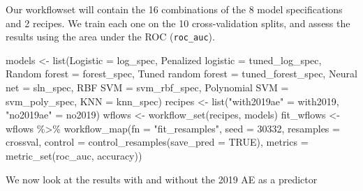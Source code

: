 \documentclass[
]{article}
\newenvironment{Shaded}{\begin{snugshade}}{\end{snugshade}}
\newcommand{\AttributeTok}[1]{\textcolor[rgb]{0.77,0.63,0.00}{#1}}
\newcommand{\ConstantTok}[1]{\textcolor[rgb]{0.00,0.00,0.00}{#1}}
\newcommand{\DecValTok}[1]{\textcolor[rgb]{0.00,0.00,0.81}{#1}}
\newcommand{\FunctionTok}[1]{\textcolor[rgb]{0.00,0.00,0.00}{#1}}
\newcommand{\NormalTok}[1]{#1}
\newcommand{\OtherTok}[1]{\textcolor[rgb]{0.56,0.35,0.01}{#1}}
\newcommand{\SpecialCharTok}[1]{\textcolor[rgb]{0.00,0.00,0.00}{#1}}
\newcommand{\StringTok}[1]{\textcolor[rgb]{0.31,0.60,0.02}{#1}}
\begin{document}
Our workflowset will contain the 16 combinations of the 8 model
specifications and 2 recipes. We train each one on the 10
cross-validation splits, and assess the results using the area under the
ROC (\texttt{roc\_auc}).

\begin{Shaded}
\begin{Highlighting}[]
\NormalTok{models }\OtherTok{\textless{}{-}} \FunctionTok{list}\NormalTok{(}\AttributeTok{Logistic =}\NormalTok{ log\_spec,}
               \StringTok{\textasciigrave{}}\AttributeTok{Penalized logistic}\StringTok{\textasciigrave{}} \OtherTok{=}\NormalTok{ tuned\_log\_spec,}
               \StringTok{\textasciigrave{}}\AttributeTok{Random forest}\StringTok{\textasciigrave{}} \OtherTok{=}\NormalTok{ forest\_spec,}
               \StringTok{\textasciigrave{}}\AttributeTok{Tuned random forest}\StringTok{\textasciigrave{}} \OtherTok{=}\NormalTok{ tuned\_forest\_spec,}
               \StringTok{\textasciigrave{}}\AttributeTok{Neural net}\StringTok{\textasciigrave{}} \OtherTok{=}\NormalTok{ sln\_spec,}
               \StringTok{\textasciigrave{}}\AttributeTok{RBF SVM}\StringTok{\textasciigrave{}} \OtherTok{=}\NormalTok{ svm\_rbf\_spec,}
               \StringTok{\textasciigrave{}}\AttributeTok{Polynomial SVM}\StringTok{\textasciigrave{}} \OtherTok{=}\NormalTok{ svm\_poly\_spec,}
               \StringTok{\textasciigrave{}}\AttributeTok{KNN}\StringTok{\textasciigrave{}} \OtherTok{=}\NormalTok{ knn\_spec)}
\NormalTok{recipes }\OtherTok{\textless{}{-}} \FunctionTok{list}\NormalTok{(}\StringTok{"with2019ae"} \OtherTok{=}\NormalTok{ with2019,}
                \StringTok{"no2019ae"} \OtherTok{=}\NormalTok{ no2019)}
\NormalTok{wflows }\OtherTok{\textless{}{-}} \FunctionTok{workflow\_set}\NormalTok{(recipes, models)}
\NormalTok{fit\_wflows }\OtherTok{\textless{}{-}}
\NormalTok{    wflows }\SpecialCharTok{\%\textgreater{}\%}
      \FunctionTok{workflow\_map}\NormalTok{(}\AttributeTok{fn =} \StringTok{"fit\_resamples"}\NormalTok{,}
                   \AttributeTok{seed =} \DecValTok{30332}\NormalTok{,}
                   \AttributeTok{resamples =}\NormalTok{ crossval,}
                   \AttributeTok{control =} \FunctionTok{control\_resamples}\NormalTok{(}\AttributeTok{save\_pred =} \ConstantTok{TRUE}\NormalTok{),}
                   \AttributeTok{metrics =} \FunctionTok{metric\_set}\NormalTok{(roc\_auc, accuracy))}
\end{Highlighting}
\end{Shaded}

We now look at the results with and without the 2019 AE as a predictor
\end{document}
